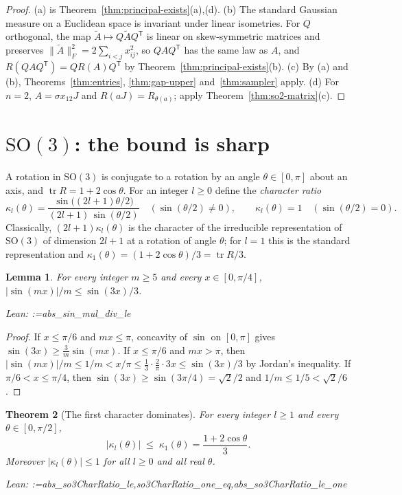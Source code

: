 \documentclass[11pt]{amsart}
\makeatletter
\newtheorem{theorem}{Theorem}[section]
\newtheorem{lemma}[theorem]{Lemma}
\theoremstyle{definition}
\theoremstyle{remark}
\newcommand{\@leanlist}[1]{\def\@leansep{}\@for\@leanname:=#1\do{\@leansep
  \texttt{\expandafter\detokenize\expandafter{\@leanname}}\def\@leansep{, }}}
\newcommand{\lean}[1]{\par\smallskip\noindent
  {\footnotesize\normalfont\raggedright\textsf{Lean:} \@leanlist{#1}\par}}
\newcommand{\SO}{\mathrm{SO}}
\newcommand{\tr}{\operatorname{tr}}
\newcommand{\fro}[1]{\lVert #1\rVert_{F}}
\newcommand{\transp}{^{\mathsf T}}
\makeatother
\begin{document}
\begin{proof}
(a) is Theorem~\ref{thm:principal-exists}(a),(d).  (b) The standard Gaussian measure on a
Euclidean space is invariant under linear isometries.  For $Q$ orthogonal, the map
$\tilde A\mapsto Q\tilde AQ\transp$ is linear on skew-symmetric matrices and preserves
$\fro{\tilde A}^2=2\sum_{i<j}x_{ij}^2$, so $QAQ\transp$ has the same law as $A$, and
$R(QAQ\transp)=QR(A)Q\transp$ by Theorem~\ref{thm:principal-exists}(b).  (c) By (a) and (b),
Theorems~\ref{thm:entries}, \ref{thm:gap-upper} and~\ref{thm:sampler} apply.  (d) For $n=2$,
$A=\sigma x_{12}J$ and $R(aJ)=R_{\theta(a)}$; apply
Theorem~\ref{thm:so2-matrix}(c).
\end{proof}

\section{\texorpdfstring{$\SO(3)$}{SO(3)}: the bound is sharp}\label{sec:sothree}

A rotation in $\SO(3)$ is conjugate to a rotation by an angle $\theta\in[0,\pi]$ about an axis,
and $\tr R=1+2\cos\theta$.  For an integer $l\ge0$ define the \emph{character ratio}
\[
  \kappa_l(\theta)=\frac{\sin\bigl((2l+1)\theta/2\bigr)}{(2l+1)\,\sin(\theta/2)}\quad(\sin(\theta/2)\ne0),
  \qquad\kappa_l(\theta)=1\quad(\sin(\theta/2)=0).
\]
Classically, $(2l+1)\kappa_l(\theta)$ is the character of the irreducible representation of
$\SO(3)$ of dimension $2l+1$ at a rotation of angle $\theta$; for $l=1$ this is the standard
representation and $\kappa_1(\theta)=(1+2\cos\theta)/3=\tr R/3$.

\begin{lemma}\label{lem:sin3}
For every integer $m\ge5$ and every $x\in[0,\pi/4]$, $|\sin(mx)|/m\le\sin(3x)/3$.
\lean{abs_sin_mul_div_le}
\end{lemma}

\begin{proof}
If $x\le\pi/6$ and $mx\le\pi$, concavity of $\sin$ on $[0,\pi]$ gives
$\sin(3x)\ge\tfrac3m\sin(mx)$.  If $x\le\pi/6$ and $mx>\pi$, then
$|\sin(mx)|/m\le1/m<x/\pi\le\tfrac13\cdot\tfrac2\pi\cdot3x\le\sin(3x)/3$ by Jordan's inequality.
If $\pi/6<x\le\pi/4$, then $\sin(3x)\ge\sin(3\pi/4)=\sqrt2/2$ and
$1/m\le1/5<\sqrt2/6$.
\end{proof}

\begin{theorem}[The first character dominates]\label{thm:so3-char}
For every integer $l\ge1$ and every $\theta\in[0,\pi/2]$,
\[
  |\kappa_l(\theta)|\;\le\;\kappa_1(\theta)=\frac{1+2\cos\theta}{3}.
\]
Moreover $|\kappa_l(\theta)|\le1$ for all $l\ge0$ and all real $\theta$.
\lean{abs_so3CharRatio_le,so3CharRatio_one_eq,abs_so3CharRatio_le_one}
\end{theorem}
\end{document}
